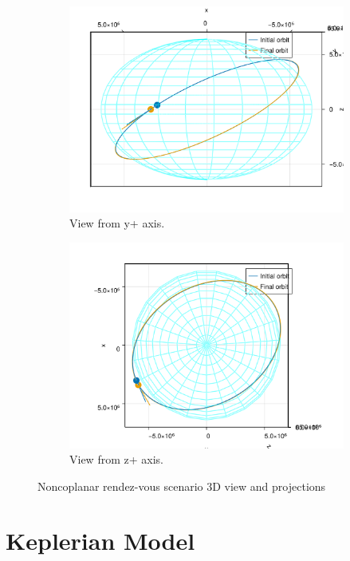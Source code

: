 \begin{figure}[htbp]
\begin{subfigure}{0.49\linewidth}
        \includegraphics[width=\linewidth]{../results/two_body/ipv_noncop/scenario_y+.png}
        \caption{View from y+ axis.}
    \end{subfigure}
    \begin{subfigure}{0.49\linewidth}
        \includegraphics[width=\linewidth]{../results/two_body/ipv_noncop/scenario_z+.png}
        \caption{View from z+ axis.}
    \end{subfigure}
    \caption{Noncoplanar rendez-vous scenario 3D view and projections}
    \label{fig:noncop_rdv_scenario}
\end{figure}

\FloatBarrier
\section{Keplerian Model}

